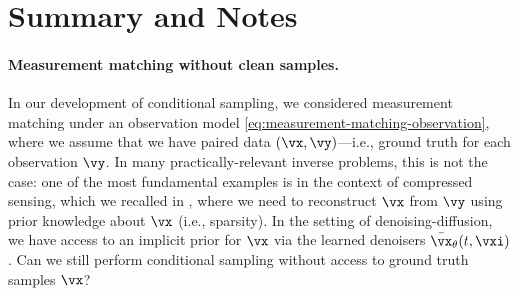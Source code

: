 \documentclass[../../book-main.tex]{subfiles}
\begin{document}


\section{Summary and Notes}
\paragraph{Measurement matching without clean samples.} In our development of
conditional sampling, we considered measurement matching under an observation
model \eqref{eq:measurement-matching-observation}, where we assume that we have
paired data $(\vx, \vy)$---i.e., ground truth for each observation $\vy$.
In many practically-relevant inverse problems, this is not the case: one of the
most fundamental examples is in the context of compressed sensing, which we
recalled in , where we need to reconstruct $\vx$ from $\vy$
using prior knowledge about $\vx$ (i.e., sparsity).
In the setting of denoising-diffusion, we have access to an implicit prior for
$\vx$ via the learned denoisers $\bar{\vx}_{\theta}(t, \vxi)$. Can we still perform 
conditional sampling without access to ground truth samples $\vx$?
\end{document}
